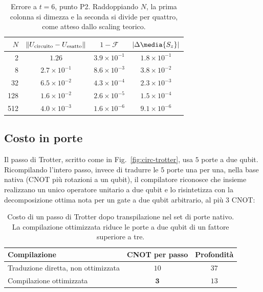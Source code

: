 \documentclass[11pt,a4paper]{article}
\begin{document}
\begin{table}[htbp]
\centering
\renewcommand{\arraystretch}{1.2}
\begin{tabular}{@{}rccc@{}}
\toprule
$N$ & $\lVert U_{\rm circuito}-U_{\rm esatto}\rVert$ & $1-\mathcal F$ & $\lvert\Delta\media{S_z}\rvert$ \\
\midrule
2 & $1.26$ & $3.9\times10^{-1}$ & $1.8\times10^{-1}$ \\
8 & $2.7\times10^{-1}$ & $8.6\times10^{-3}$ & $3.8\times10^{-2}$ \\
32 & $6.5\times10^{-2}$ & $4.3\times10^{-4}$ & $2.3\times10^{-3}$ \\
128 & $1.6\times10^{-2}$ & $2.6\times10^{-5}$ & $1.5\times10^{-4}$ \\
512 & $4.0\times10^{-3}$ & $1.6\times10^{-6}$ & $9.1\times10^{-6}$ \\
\bottomrule
\end{tabular}
\caption{Errore a $t=6$, punto P2. Raddoppiando $N$, la prima colonna si
dimezza e la seconda si divide per quattro, come atteso dallo scaling
teorico.}
\label{tab:errore-trotter}
\end{table}

\subsection{Costo in porte}

Il passo di Trotter, scritto come in Fig.~\ref{fig:circ-trotter}, usa $5$
porte a due qubit. Ricompilando l'intero passo, invece di tradurre le $5$
porte una per una, nella base nativa (CNOT più rotazioni a un qubit), il
compilatore riconosce che insieme realizzano un unico operatore unitario a
due qubit e lo risintetizza con la decomposizione ottima nota per un gate
a due qubit arbitrario, al più $3$ CNOT:

\begin{table}[htbp]
\centering
\renewcommand{\arraystretch}{1.25}
\begin{tabular}{@{}lcc@{}}
\toprule
Compilazione & CNOT per passo & Profondità \\
\midrule
Traduzione diretta, non ottimizzata & $10$ & $37$ \\
Compilazione ottimizzata & $\mathbf{3}$ & $13$ \\
\bottomrule
\end{tabular}
\caption{Costo di un passo di Trotter dopo transpilazione nel set di porte
nativo. La compilazione ottimizzata riduce le porte a due qubit di un
fattore superiore a tre.}
\label{tab:costo-trotter}
\end{table}
\FloatBarrier
\end{document}
